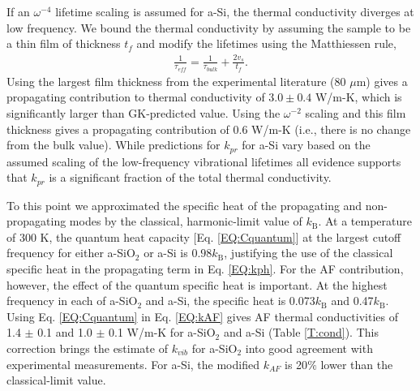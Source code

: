\documentclass[aps,prb,twocolumn,superscriptaddress,footinbib,amsmath,amssymb,floatfix]{revtex4}
\begin{document}
If an $\omega^{-4}$ lifetime scaling is assumed for a-Si, 
the thermal conductivity diverges at low frequency. We bound the 
thermal conductivity by assuming the sample to be a thin film 
of thickness $t_f$ and modify the lifetimes using the Matthiessen 
rule,\cite{ziman_electrons_2001} 
\begin{equation}\label{EQ:LambdaMatth}
\begin{split}
\frac{1}{\tau_{eff}} = \frac{1}{\tau_{bulk}} + 
\frac{2v_s}{t_f}.
\end{split}
\end{equation}
Using the largest film thickness from the experimental 
literature ($80$ $\mu$m)\cite{liu_high_2009} 
gives a propagating contribution 
to thermal conductivity of $3.0 \pm 0.4$ W/m-K, which is 
significantly larger than GK-predicted value. 
Using the $\omega^{-2}$ scaling and this film thickness 
gives a propagating contribution of 0.6 W/m-K (i.e., there is 
no change from the bulk value). 
While predictions for $k_{pr}$ for a-Si  
vary based on the assumed scaling of the low-frequency 
vibrational lifetimes 
all evidence supports that $k_{pr}$ is a significant fraction 
of the total thermal conductivity.
\cite{feldman_thermal_1993,cahill_thermal_1994,
feldman_numerical_1999,liu_high_2009,
yang_anomalously_2010,
he_heat_2011,regner_broadband_2013}

To this point we approximated the specific heat 
of the propagating 
and non-propagating modes by the classical, harmonic-limit 
value of $k_{\text{B}}$. At a temperature of $300$ K, the quantum 
heat capacity [Eq. \eqref{EQ:Cquantum}] 
at the largest cutoff frequency for either a-SiO$_2$ or a-Si 
is $0.98 k_{\text{B}}$, justifying the 
use of the classical specific heat in the propagating term 
in Eq. \eqref{EQ:kph}. For the AF contribution, however, the 
effect of the quantum specific heat is important. At the highest 
frequency in each of a-SiO$_2$ and a-Si, the specific heat is 
0.073$k_{\text{B}}$ and 0.47$k_{\text{B}}$. 
Using Eq. \eqref{EQ:Cquantum} 
in Eq. \eqref{EQ:kAF} gives AF thermal conductivities of 
1.4 $\pm$ 0.1 and 
1.0 $\pm$ 0.1 W/m-K for a-SiO$_2$ and a-Si (Table \ref{T:cond}). 
This correction brings the estimate of $k_{vib}$ for 
a-SiO$_2$ into good agreement with experimental measurements.
\cite{cahill_lattice_1988,lee_heat_1997,
yamane_measurement_2002,regner_broadband_2013} 
For a-Si, the modified $k_{AF}$ is 20$\%$ lower than the 
classical-limit value. 
\end{document}
